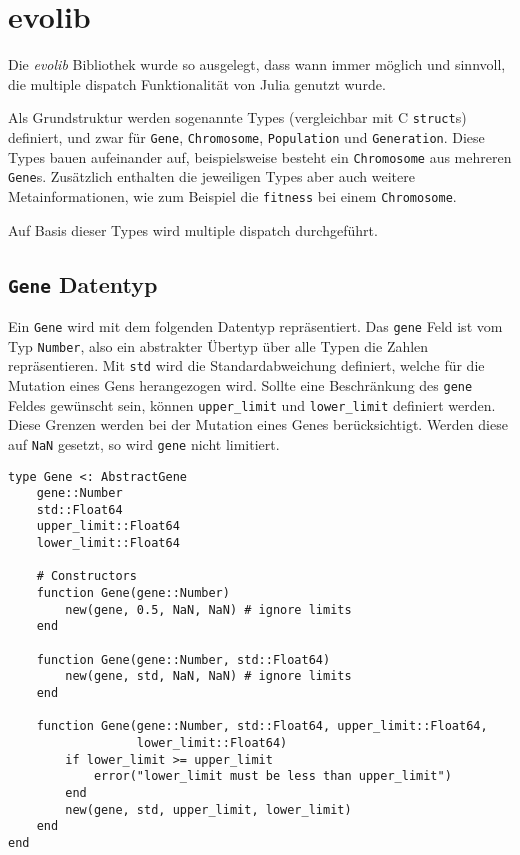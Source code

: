\section{evolib}\label{evolib}

Die \textit{evolib} Bibliothek wurde so ausgelegt, dass wann immer möglich und sinnvoll, die multiple dispatch Funktionalität von Julia genutzt wurde.

Als Grundstruktur werden sogenannte Types (vergleichbar mit C \texttt{struct}s) definiert, und zwar für \texttt{Gene}, \texttt{Chromosome}, \texttt{Population} und \texttt{Generation}. 
Diese Types bauen aufeinander auf, beispielsweise besteht ein \texttt{Chromosome} aus mehreren \texttt{Gene}s. 
Zusätzlich enthalten die jeweiligen Types aber auch weitere Metainformationen, wie zum Beispiel die \texttt{fitness} bei einem \texttt{Chromosome}.

Auf Basis dieser Types wird multiple dispatch durchgeführt.

\subsection{\texttt{Gene} Datentyp}

Ein \texttt{Gene} wird mit dem folgenden Datentyp repräsentiert. 
Das \texttt{gene} Feld ist vom Typ \texttt{Number}, also ein abstrakter Übertyp über alle Typen die Zahlen repräsentieren. 
Mit \texttt{std} wird die Standardabweichung definiert, welche für die Mutation eines Gens herangezogen wird.
Sollte eine Beschränkung des \texttt{gene} Feldes gewünscht sein, können \texttt{upper\_limit} und \texttt{lower\_limit} definiert werden. 
Diese Grenzen werden bei der Mutation eines Genes berücksichtigt. Werden diese auf \texttt{NaN} gesetzt, so wird \texttt{gene} nicht limitiert.
\begin{Verbatim}
type Gene <: AbstractGene
    gene::Number
    std::Float64
    upper_limit::Float64
    lower_limit::Float64

    # Constructors
    function Gene(gene::Number) 
        new(gene, 0.5, NaN, NaN) # ignore limits
    end
                                            
    function Gene(gene::Number, std::Float64) 
        new(gene, std, NaN, NaN) # ignore limits
    end
                                                            
    function Gene(gene::Number, std::Float64, upper_limit::Float64, 
                  lower_limit::Float64)
        if lower_limit >= upper_limit
            error("lower_limit must be less than upper_limit")
        end
        new(gene, std, upper_limit, lower_limit)
    end
end
\end{Verbatim}

